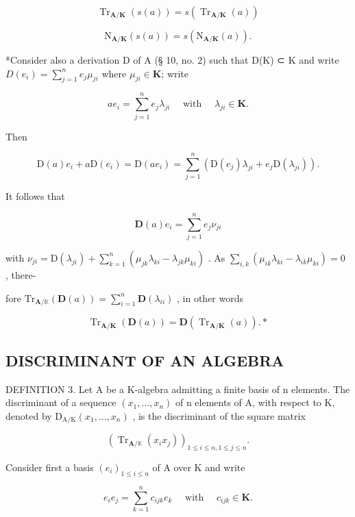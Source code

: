 \[
\operatorname{Tr} _ {\mathbf {A} / \mathbf {K}} (s (a)) = s (\operatorname{Tr} _ {\mathbf {A} / \mathbf {K}} (a))\tag{28}
\]

\[
\mathrm{N} _ {\mathbf {A} / \mathbf {K}} (s (a)) = s (\mathrm{N} _ {\mathbf {A} / \mathbf {K}} (a)).
\]

*Consider also a derivation D of A (§ 10, no. 2) such that D(K) ⊂ K and write \(D (e _ {i}) = \sum_ {j = 1} ^ {n} e _ {j} \mu_ {j i}\) where \(\mu_ {j i} \in \mathbf {K}\); write

\[
a e _ {i} = \sum_ {j = 1} ^ {n} e _ {j} \lambda_ {j i} \quad \text { with } \quad \lambda_ {j i} \in \mathbf {K}.
\]

Then

\[
\mathrm{D} (a) e _ {i} + a \mathrm{D} (e _ {i}) = \mathrm{D} (a e _ {i}) = \sum_ {j = 1} ^ {n} (\mathrm{D} (e _ {j}) \lambda_ {j i} + e _ {j} \mathrm{D} (\lambda_ {j i})).
\]

It follows that

\[
\mathbf {D} (a) e _ {i} = \sum_ {j = 1} ^ {n} e _ {j} \nu_ {j i}
\]

with \(\nu_{ji} = \mathrm{D}(\lambda_{ji}) + \sum_{k=1}^{n} (\mu_{jk}\lambda_{ki} - \lambda_{jk}\mu_{ki})\) . As \(\sum_{i,k} (\mu_{ik}\lambda_{ki} - \lambda_{ik}\mu_{ki}) = 0\) , there-

fore \(\mathrm{Tr}_{\mathbf{A} / \mathbb{K}}(\mathbf{D}(a)) = \sum_{i = 1}^{n}\mathbf{D}(\lambda_{ii})\) , in other words

\[
\operatorname{Tr} _ {\mathbf {A} / \mathbf {K}} (\mathbf {D} (a)) = \mathbf {D} (\operatorname{Tr} _ {\mathbf {A} / \mathbf {K}} (a)). *\tag{29}
\]

\subsection{DISCRIMINANT OF AN ALGEBRA}

DEFINITION 3. Let A be a K-algebra admitting a finite basis of n elements. The discriminant of a sequence \((x_{1},\ldots,x_{n})\) of n elements of A, with respect to K, denoted by \(\mathrm{D}_{\mathrm{A}/\mathrm{K}}(x_{1},\ldots,x_{n})\) , is the discriminant of the square matrix

\[
\left(\operatorname{Tr} _ {\mathbf {A} / \mathbb {K}} \left(x _ {i} x _ {j}\right)\right) _ {1 \leqslant i \leqslant n, 1 \leqslant j \leqslant n}.
\]

Consider first a basis \((e_i)_{1\leqslant i\leqslant n}\) of A over K and write

\[
e _ {i} e _ {j} = \sum_ {k = 1} ^ {n} c _ {i j k} e _ {k} \quad \text { with } \quad c _ {i j k} \in \mathbf {K}.\tag{30}
\]

